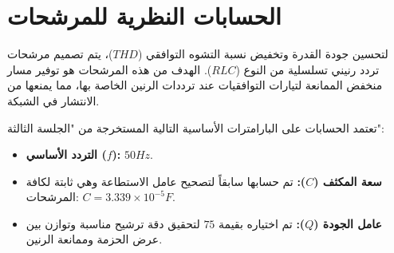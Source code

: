 
\section{الحسابات النظرية للمرشحات} \label{part1:sec2}
  
  {\fontsize{16}{27}\selectfont
  لتحسين جودة القدرة وتخفيض نسبة التشوه التوافقي ($THD$)، يتم تصميم مرشحات تردد رنيني  تسلسلية من النوع ($RLC$). الهدف من هذه المرشحات هو توفير مسار منخفض الممانعة لتيارات التوافقيات عند ترددات الرنين الخاصة بها، مما يمنعها من الانتشار في الشبكة.
  \par}
 \vspace{5pt} 
{\sloppy
\noindent تعتمد الحسابات على البارامترات الأساسية التالية المستخرجة من "الجلسة الثالثة":}
\begin{itemize}
    \item \textbf{التردد الأساسي ($f$):} $50 Hz$.
    \item \textbf{سعة المكثف ($C$):} تم حسابها سابقاً لتصحيح عامل الاستطاعة وهي ثابتة لكافة المرشحات: $C = 3.339 \times 10^{-5} F$.
    \item \textbf{عامل الجودة ($Q$):} تم اختياره بقيمة $75$ لتحقيق دقة ترشيح مناسبة وتوازن بين عرض الحزمة وممانعة الرنين.
\end{itemize}







